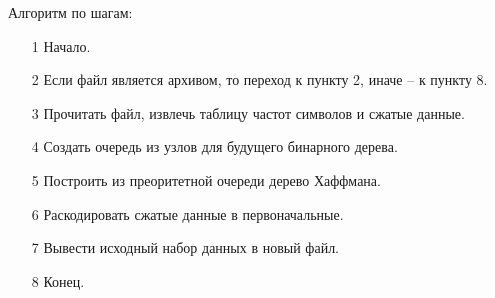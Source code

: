 Алгоритм по шагам:
\begin{enumerate}
    \item[1] Начало.
    \item[2] Если файл является архивом, то переход к пункту 2, иначе -- к пункту 8.
    \item[3] Прочитать файл, извлечь таблицу частот символов и сжатые данные.
    \item[4] Создать очередь из узлов для будущего бинарного дерева.
    \item[5] Построить из преоритетной очереди дерево Хаффмана.
    \item[6] Раскодировать сжатые данные в первоначальные.
    \item[7] Вывести исходный набор данных в новый файл.
    \item[8] Конец.
\end{enumerate}
